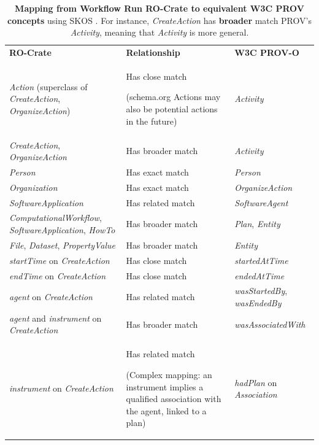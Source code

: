 \documentclass[10pt,letterpaper]{article}
\newlength\savedwidth
\newcommand\thickhline{\noalign{\global\savedwidth\arrayrulewidth\global\arrayrulewidth 2pt}%
\hline
\noalign{\global\arrayrulewidth\savedwidth}}
\begin{document}
\begin{table}[!ht]
  \begin{adjustwidth}{-1.5cm}{0in}
  \centering
  \caption{
  {\bf Mapping from Workflow Run RO-Crate to equivalent W3C PROV concepts} using SKOS \cite{Isaac 2009}. For instance, \emph{CreateAction} has \textbf{broader} match PROV's \emph{Activity}, meaning that \emph{Activity} is more general.}
  \begin{tabular}{p{35mm}|p{40mm}|p{40mm}}
  \hline
  {\bf RO-Crate} & \textbf{Relationship} & {\bf W3C PROV-O} \\
  \thickhline
  
  

  \emph{Action} (superclass of \emph{CreateAction}, \emph{OrganizeAction}) & 
    Has close match 
    \begin{small}
      (schema.org Actions may also be potential actions in the future)
    \end{small}
    & 
    \emph{Activity}
    \\ \hline
  \emph{CreateAction}, \emph{OrganizeAction} & 
    Has broader match & 
    \emph{Activity}
    \\ \hline
  \emph{Person} & 
    Has exact match & 
    \emph{Person}
    \\ \hline
  \emph{Organization} & 
    Has exact match & 
    \emph{OrganizeAction} 
    \\ \hline
  \emph{SoftwareApplication} & 
    Has related match & 
    \emph{SoftwareAgent}
    \\ \hline
  \emph{ComputationalWorkflow}, \emph{SoftwareApplication}, \emph{HowTo} & 
    Has broader match & 
    \emph{Plan},
    \emph{Entity}
    \\ \hline
  \emph{File}, \emph{Dataset}, \emph{PropertyValue} & 
    Has broader match & 
    \emph{Entity}
    \\ \hline
  \emph{startTime} on \emph{CreateAction} & 
    Has close match & 
    \emph{startedAtTime}
    \\ \hline
  \emph{endTime} on \emph{CreateAction} & 
    Has close match & 
    \emph{endedAtTime}
    \\ \hline
  \emph{agent} on \emph{CreateAction} & 
    Has related match & 
    \emph{wasStartedBy}, \emph{wasEndedBy}
    \\ \hline
  \emph{agent} and \emph{instrument} on \emph{CreateAction} & 
    Has broader match & 
    \emph{wasAssociatedWith}
    \\ \hline
  \emph{instrument} on \emph{CreateAction} & 
    Has related match 
    \begin{small}
      (Complex mapping: an instrument implies a qualified association with the agent, linked to a plan)
    \end{small}
    & 
    \emph{hadPlan} on \emph{Association}
    \\ \hline


\end{tabular}
\end{adjustwidth}
\end{table}
\end{document}
